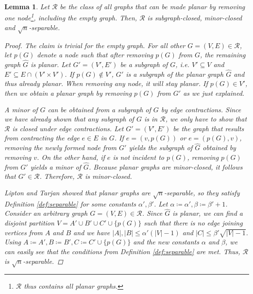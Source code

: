 \documentclass[a4paper, 10pt, oneside]{article}
\theoremstyle{plain}
\newtheorem{lemma}[theorem]{Lemma}
\theoremstyle{definition}
\numberwithin{equation}{section}
\newcommand{\calR}{\mathcal{R}}
\newcommand{\equalDef}{\coloneqq}
\begin{document}
\begin{lemma} \label{lemma:almostPlanarSeparable}
Let $\calR$ be the class of all graphs that can be made planar by removing one node\footnote{$\calR$ thus contains all planar graphs.}, including the empty graph. Then, $\calR$ is subgraph-closed, minor-closed and $\sqrt{n}$-separable.

\begin{proof}
The claim is trivial for the empty graph. For all other $G = (V, E) \in \calR$, let $p(G)$ denote a node such that after removing $p(G)$ from $G$, the remaining graph $\widehat{G}$ is planar. Let $G' = (V', E')$ be a subgraph of $G$, i.e. $V' \subseteq V$ and $E' \subseteq E \cap (V' \times V')$. If $p(G) \not \in V'$, $G'$ is a subgraph of the planar graph $\widehat{G}$ and thus already planar. When removing any node, it will stay planar. If $p(G) \in V'$, then we obtain a planar graph by removing $p(G)$ from $G'$ as we just explained.

A minor of $G$ can be obtained from a subgraph of $G$ by edge contractions. Since we have already shown that any subgraph of $G$ is in $\calR$, we only have to show that $\calR$ is closed under edge contractions. Let $G' = (V', E')$ be the graph that results from contracting the edge $e \in E$ in $G$. If $e = (v, p(G))$ or $e = (p(G), v)$, removing the newly formed node from $G'$ yields the subgraph of $\widehat{G}$ obtained by removing $v$. On the other hand, if $e$ is not incident to $p(G)$, removing $p(G)$ from $G'$ yields a minor of $\widehat{G}$. Because planar graphs are minor-closed, it follows that $G' \in \calR$. Therefore, $\calR$ is minor-closed.

Lipton and Tarjan \cite{lipton1979} showed that planar graphs are $\sqrt{n}$-separable, so they satisfy Definition \ref{def:separable} for some constants $\alpha', \beta'$. Let $\alpha \equalDef \alpha', \beta \equalDef \beta' + 1$. Consider an arbitrary graph $G = (V, E) \in \calR$. Since $\widehat{G}$ is planar, we can find a disjoint partition $V = A' \cup B' \cup C' \cup \{p(G)\}$ such that there is no edge joining vertices from $A$ and $B$ and we have $|A|, |B| \leq \alpha' (|V| - 1)$ and $|C| \leq \beta' \sqrt{|V| - 1}$. Using $A \equalDef A', B \equalDef B', C \equalDef C' \cup \{p(G)\}$ and the new constants $\alpha$ and $\beta$, we can easily see that the conditions from Definition \ref{def:separable} are met. Thus, $\calR$ is $\sqrt{n}$-separable.
\end{proof}
\end{lemma}
\end{document}
